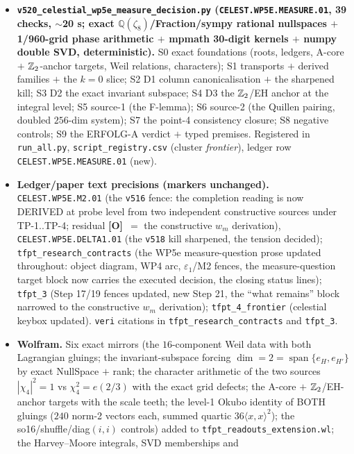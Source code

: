 \documentclass[11pt]{article}
\providecommand{\mO}{\textbf{[O]}}\providecommand{\mX}{\textbf{[X]}}
\providecommand{\Q}{\mathbb{Q}}
\begin{document}
\begin{itemize}[leftmargin=1.5em]
\item \textbf{\texttt{v520\_celestial\_wp5e\_measure\_decision.py} (\texttt{CELEST.WP5E.MEASURE.01},
39 checks, $\sim$20 s; exact $\Q(\zeta_8)$/Fraction/sympy rational nullspaces $+$ 1/960-grid
phase arithmetic $+$ mpmath 30-digit kernels $+$ numpy double SVD, deterministic).} S0 exact
foundations (roots, ledgers, A-core $+$ $\mathbb{Z}_2$-anchor targets, Weil relations, characters); S1
transports $+$ derived families $+$ the $k=0$ slice; S2 D1 column canonicalisation $+$ the
sharpened kill; S3 D2 the exact invariant subspace; S4 D3 the $\mathbb{Z}_2$/EH anchor at the integral
level; S5 source-1 (the F-lemma); S6 source-2 (the Quillen pairing, doubled $256$-dim system);
S7 the point-4 consistency closure; S8 negative controls; S9 the ERFOLG-A verdict $+$ typed
premises. Registered in \texttt{run\_all.py}, \texttt{script\_registry.csv} (cluster
\emph{frontier}), ledger row \texttt{CELEST.WP5E.MEASURE.01} (new).
\item \textbf{Ledger/paper text precisions (markers unchanged).} \texttt{CELEST.WP5E.M2.01}
(the \texttt{v516} fence: the completion reading is now DERIVED at probe level from two
independent constructive sources under TP-1..TP-4; residual \mO\ $=$ the constructive $w_m$
derivation), \texttt{CELEST.WP5E.DELTA1.01} (the \texttt{v518} kill sharpened, the tension
decided); \texttt{tfpt\_research\_contracts} (the WP5e measure-question prose updated
throughout: object diagram, WP4 arc, $\varepsilon_1$/M2 fences, the measure-question target
block now carries the executed decision, the closing status lines);
\texttt{tfpt\_3} (Step 17/19 fences updated, new Step 21, the ``what remains'' block narrowed
to the constructive $w_m$ derivation); \texttt{tfpt\_4\_frontier} (celestial keybox updated).
\texttt{veri} citations in \texttt{tfpt\_research\_contracts} and \texttt{tfpt\_3}.
\item \textbf{Wolfram.} Six exact mirrors (the $16$-component Weil data with both Lagrangian
gluings; the invariant-subspace forcing $\dim=2=\operatorname{span}\{e_H,e_{H'}\}$ by exact
NullSpace $+$ rank; the character arithmetic of the two sources $|\chi_4|^2=1$ vs
$\chi_4^2=e(2/3)$ with the exact grid defects; the A-core $+$ $\mathbb{Z}_2$/EH-anchor targets with
the scale teeth; the level-1 Okubo identity of BOTH gluings ($240$ norm-2 vectors each, summed
quartic $36\langle x,x\rangle^2$); the so16/shuffle/diag$(i,i)$ controls) added to
\texttt{tfpt\_readouts\_extension.wl}; the Harvey--Moore integrals, SVD memberships and

\end{itemize}
\end{document}
